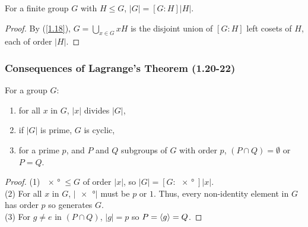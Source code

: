 For a finite group $G$ with $H \leq G$, $|G| = [G : H]|H|$.

\begin{proof}
    By (\ref{1.18}), $G = \bigcup_{x \in G} xH$ is the disjoint union of
    $[G : H]$ left cosets of $H$, each of order $|H|$.
\end{proof}

\newpage

\subsubsection{Consequences of Lagrange's Theorem (1.20-22)}
\label{1.20} \label{1.21} \label{1.22}

For a group $G$: \begin{enumerate}
    \item for all $x$ in $G$, $|x|$ divides $|G|$,
    \item if $|G|$ is prime, $G$ is cyclic,
    \item for a prime $p$, and $P$ and $Q$ subgroups of $G$ with order $p$,
        $(P \cap Q) = \emptyset$ or $P = Q$.
\end{enumerate}

\begin{proof}
    (1) $\ang{x} \leq G$ of order $|x|$, so $|G| = [G : \ang{x}]|x|$. \\[\baselineskip]
    (2) For all $x$ in $G$, $|\ang{x}|$ must be $p$ or $1$. Thus, every non-identity
    element in $G$ has order $p$ so generates $G$. \\[\baselineskip]
    (3) For $g \neq e$ in $(P \cap Q)$, $|g| = p$ so $P = {\langle g \rangle} = Q$.
\end{proof}
